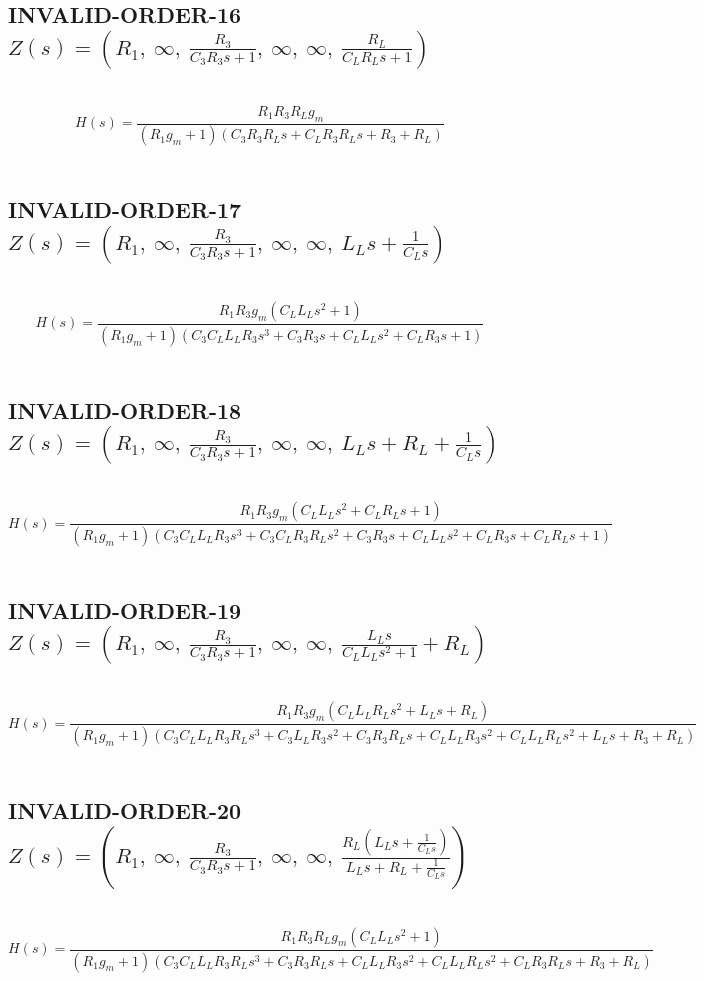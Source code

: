 \documentclass{article}
\begin{document}
\subsection{INVALID-ORDER-16 $Z(s) = \left( R_{1}, \  \infty, \  \frac{R_{3}}{C_{3} R_{3} s + 1}, \  \infty, \  \infty, \  \frac{R_{L}}{C_{L} R_{L} s + 1}\right)$ } \ 
\textbf{\[H(s) = \frac{R_{1} R_{3} R_{L} g_{m}}{\left(R_{1} g_{m} + 1\right) \left(C_{3} R_{3} R_{L} s + C_{L} R_{3} R_{L} s + R_{3} + R_{L}\right)}\] } \ 
\subsection{INVALID-ORDER-17 $Z(s) = \left( R_{1}, \  \infty, \  \frac{R_{3}}{C_{3} R_{3} s + 1}, \  \infty, \  \infty, \  L_{L} s + \frac{1}{C_{L} s}\right)$ } \ 
\textbf{\[H(s) = \frac{R_{1} R_{3} g_{m} \left(C_{L} L_{L} s^{2} + 1\right)}{\left(R_{1} g_{m} + 1\right) \left(C_{3} C_{L} L_{L} R_{3} s^{3} + C_{3} R_{3} s + C_{L} L_{L} s^{2} + C_{L} R_{3} s + 1\right)}\] } \ 
\subsection{INVALID-ORDER-18 $Z(s) = \left( R_{1}, \  \infty, \  \frac{R_{3}}{C_{3} R_{3} s + 1}, \  \infty, \  \infty, \  L_{L} s + R_{L} + \frac{1}{C_{L} s}\right)$ } \ 
\textbf{\[H(s) = \frac{R_{1} R_{3} g_{m} \left(C_{L} L_{L} s^{2} + C_{L} R_{L} s + 1\right)}{\left(R_{1} g_{m} + 1\right) \left(C_{3} C_{L} L_{L} R_{3} s^{3} + C_{3} C_{L} R_{3} R_{L} s^{2} + C_{3} R_{3} s + C_{L} L_{L} s^{2} + C_{L} R_{3} s + C_{L} R_{L} s + 1\right)}\] } \ 
\subsection{INVALID-ORDER-19 $Z(s) = \left( R_{1}, \  \infty, \  \frac{R_{3}}{C_{3} R_{3} s + 1}, \  \infty, \  \infty, \  \frac{L_{L} s}{C_{L} L_{L} s^{2} + 1} + R_{L}\right)$ } \ 
\textbf{\[H(s) = \frac{R_{1} R_{3} g_{m} \left(C_{L} L_{L} R_{L} s^{2} + L_{L} s + R_{L}\right)}{\left(R_{1} g_{m} + 1\right) \left(C_{3} C_{L} L_{L} R_{3} R_{L} s^{3} + C_{3} L_{L} R_{3} s^{2} + C_{3} R_{3} R_{L} s + C_{L} L_{L} R_{3} s^{2} + C_{L} L_{L} R_{L} s^{2} + L_{L} s + R_{3} + R_{L}\right)}\] } \ 
\subsection{INVALID-ORDER-20 $Z(s) = \left( R_{1}, \  \infty, \  \frac{R_{3}}{C_{3} R_{3} s + 1}, \  \infty, \  \infty, \  \frac{R_{L} \left(L_{L} s + \frac{1}{C_{L} s}\right)}{L_{L} s + R_{L} + \frac{1}{C_{L} s}}\right)$ } \ 
\textbf{\[H(s) = \frac{R_{1} R_{3} R_{L} g_{m} \left(C_{L} L_{L} s^{2} + 1\right)}{\left(R_{1} g_{m} + 1\right) \left(C_{3} C_{L} L_{L} R_{3} R_{L} s^{3} + C_{3} R_{3} R_{L} s + C_{L} L_{L} R_{3} s^{2} + C_{L} L_{L} R_{L} s^{2} + C_{L} R_{3} R_{L} s + R_{3} + R_{L}\right)}\] } \ 
\end{document}
